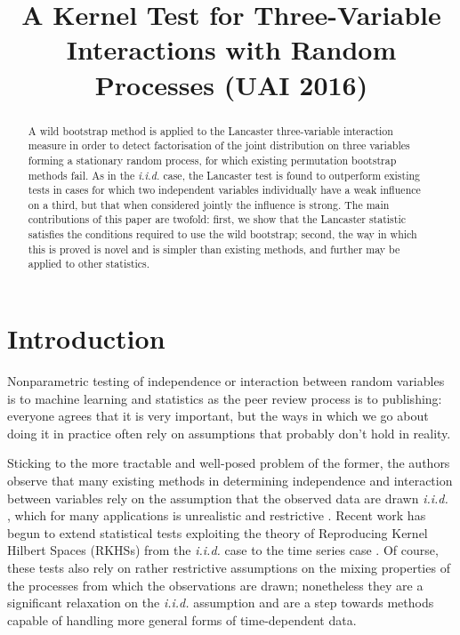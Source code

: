 \documentclass[]{article}
\title{A Kernel Test for Three-Variable Interactions with Random Processes (UAI 2016)}
\author{} %
\begin{document}
\maketitle

\begin{abstract} 

A wild bootstrap method is applied to the Lancaster three-variable interaction measure in order to detect factorisation of the joint distribution on three variables forming a stationary random process, for which existing permutation bootstrap methods fail. As in the \emph{i.i.d. } case, the Lancaster test is found to outperform existing tests in cases for which two independent variables individually have a weak influence on a third, but that when considered jointly the influence is strong. The main contributions of this paper are twofold: first, we show that the Lancaster statistic satisfies the conditions required to use the wild bootstrap; second, the way in which this is proved is novel and is simpler than existing methods, and further may be applied to other statistics.

\end{abstract} 

\section{Introduction}
\label{introduction}

Nonparametric testing of independence or interaction between random variables is to machine learning and statistics as the peer review process is to publishing: everyone agrees that it is very important, but the ways in which we go about doing it in practice often rely on assumptions that probably don't hold in reality. 

Sticking to the more tractable and well-posed problem of the former, the authors observe that many existing methods in determining independence and interaction between variables rely on the assumption that the observed data are drawn \emph{i.i.d. }, which for many applications is unrealistic and restrictive \cite{gretton2005measuring}\cite{gretton2007kernel}\cite{gretton2005kernel}\cite{sejdinovic2013kernel}. Recent work has begun to extend statistical tests exploiting the theory of Reproducing Kernel Hilbert Spaces (RKHSs) from the \emph{i.i.d. } case to the time series case \cite{chwialkowski2014wild}\cite{chwialkowski2014kernel}. Of course, these tests also rely on rather restrictive assumptions on the mixing properties of the processes from which the observations are drawn; nonetheless they are a significant relaxation on the \emph{i.i.d. } assumption and are a step towards methods capable of handling more general forms of time-dependent data. 
\end{document}
